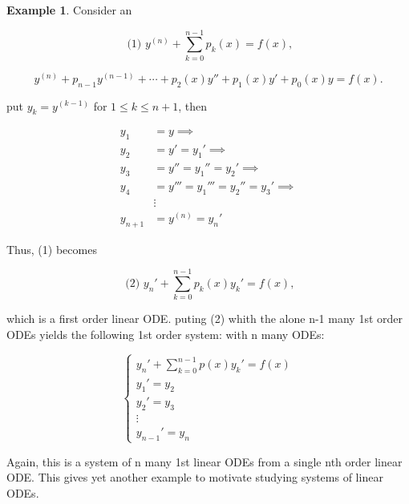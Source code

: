 \documentclass[12pt,a4paper]{article}
\theoremstyle{definition}
\newtheorem*{example}{Example}
\begin{document}
\begin{example}
  Consider an 

  \[ \text{ (1) } y^{(n)}+ \sum_{k=0}^{n-1} p_k(x) = f(x), \]

  \[ y^{(n)} + p_{n-1}y^{(n-1)} + \cdots + p_2(x)y'' + p_1(x)y' +
  p_0(x)y = f(x). \]

  put \(y_k = y^{(k-1)}  \) for \( 1 \leq k \leq n+1 \), then 

  \begin{align*}
    y_1 &= y \implies \\
    y_2 &= y' = y_1' \implies \\
    y_3 &= y'' = y_1'' = y_2' \implies \\
    y_4 &= y''' = y_1''' = y_2'' = y_3'  \implies \\
    &\vdots \\
    y_{n+1} &= y^{(n)} = y_n'
  \end{align*}

  Thus, (1) becomes 

  \[ \text{ (2) } y_n' + \sum_{k=0}^{n-1}p_k(x)y_k' = f(x), \]

  which is a first order linear ODE. puting (2) whith the alone n-1
  many 1st order ODEs yields the following 1st order system: with n
  many ODEs:

  \[
  \begin{cases}
  y_n' + \sum_{k=0}^{n-1}p(x)y_k' = f(x)  \\
  y_1' = y_2 \\
  y_2' = y_3 \\
  \vdots \\
  y_{n-1}' = y_n
  \end{cases}
\]

Again, this is a system of n many 1st linear ODEs from a single nth
order linear ODE. This gives yet another example to motivate studying
systems of linear ODEs.

\end{example}
\end{document}

